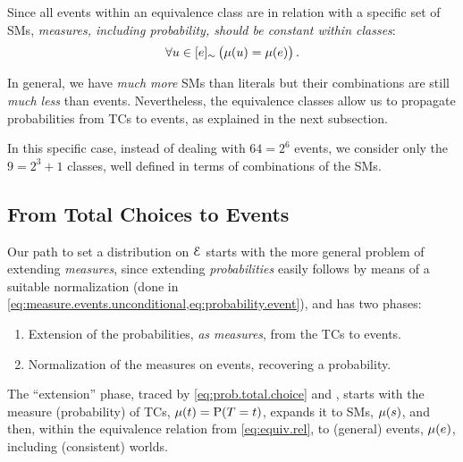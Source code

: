 \documentclass{article}
\newcommand{\at}[1]{\ensuremath{\!\del{#1}}}
\newcommand{\cla}[1]{\ensuremath{{\cal #1}}}
\newcommand{\prfunc}{\ensuremath{\mathrm{P}}}
\newcommand{\pr}[1]{\ensuremath{\prfunc\at{#1}}}
\newcommand{\pw}[1]{\ensuremath{\mu\at{#1}}}
\newcommand{\class}[1]{\ensuremath{[{#1}]_{\sim}}}
\newcommand{\EVENTSset}{\ensuremath{\cla{E}}}
\begin{document}
Since all events within an equivalence class are in relation with a
specific set of \aclp{SM}, \emph{measures, including probability,
  should be constant within classes}:
$$
	\forall u\in \class{e} \left(\mu\at{u} = \mu\at{e} \right).
$$

In general, we have \emph{much more} \aclp{SM} than literals but their
combinations are still \emph{much less} than events.  Nevertheless,
the equivalence classes allow us to propagate probabilities from
\aclp{TC} to events, as explained in the next subsection.

In this specific case, instead of dealing with $64 = 2^6$ events, we
consider only the $9 = 2^3 + 1$ classes, well defined in terms of
combinations of the \aclp{SM}.

%
%
%
\subsection{From Total Choices to Events}\label{subsec:from.tchoices.to.events}
%
%
%
Our path to set a distribution on $\EVENTSset$ starts with the more
general problem of extending \emph{measures}, since extending
\emph{probabilities} easily follows by means of a suitable
normalization (done in
\cref{eq:measure.events.unconditional,eq:probability.event}), and has
two phases:

\begin{enumerate}
\item Extension of the probabilities, \emph{as measures}, from the
  \aclp{TC} to events.
\item Normalization of the measures on events, recovering a
  probability.
\end{enumerate}

The ``extension'' phase, traced by \cref{eq:prob.total.choice} and
, starts with the
measure (probability) of \aclp{TC}, $\pw{t} = \pr{T = t}$, expands it
to \aclp{SM}, $\pw{s}$, and then, within the equivalence relation from
\cref{eq:equiv.rel}, to (general) events, $\pw{e}$, including
(consistent) worlds.
\end{document}
